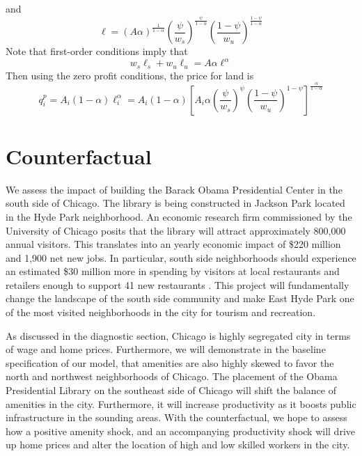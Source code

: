 \documentclass[12pt]{article}
\begin{document}
and 
\begin{equation*}
    \ell = (A\alpha)^{\frac{1}{1-\alpha}}\left(\frac{\psi}{w_s}\right)^{\frac{\psi}{1-\alpha}}\left(\frac{1-\psi}{w_u}\right)^{\frac{1-\psi}{1-\alpha}}
\end{equation*}
Note that first-order conditions imply that 
\begin{equation*}
    w_s\ell_s +  w_u\ell_u = A\alpha\ell^\alpha
\end{equation*}
Then using the zero profit conditions, the price for land is 
\begin{equation*}
    q_i^p = A_i(1-\alpha)\ell_i^\alpha = A_i(1-\alpha)\left[A_i\alpha\left(\frac{\psi}{w_s}\right)^{\psi}\left(\frac{1-\psi}{w_u}\right)^{1-\psi}\right]^{\frac{\alpha}{1-\alpha}}
\end{equation*}


\section{Counterfactual}

We assess the impact of building the Barack Obama Presidential Center in the south side of Chicago. The library is being constructed in Jackson Park located in the Hyde Park neighborhood. An economic research firm commissioned by the University of Chicago posits that the library will attract approximately 800,000 annual visitors. This translates into an yearly economic impact of \$220 million and 1,900 net new jobs. In particular, south side neighborhoods should experience an estimated \$30 million more in spending by visitors at local restaurants and retailers enough to support 41 new restaurants \citep{aeg2014}. This project will fundamentally change the landscape of the south side community and make East Hyde Park one of the most visited neighborhoods in the city for tourism and recreation. 

As discussed in the diagnostic section, Chicago is highly segregated city in terms of wage and home prices. Furthermore, we will demonstrate in the baseline specification of our model, that amenities are also highly skewed to favor the north and northwest neighborhoods of Chicago. The placement of the Obama Presidential Library on the southeast side of Chicago will shift the balance of amenities in the city. Furthermore, it will increase productivity as it boosts public infrastructure in the sounding areas. With the counterfactual, we hope to assess how a positive amenity shock, and an accompanying productivity shock will drive up home prices and alter the location of high and low skilled workers in the city.
\end{document}
